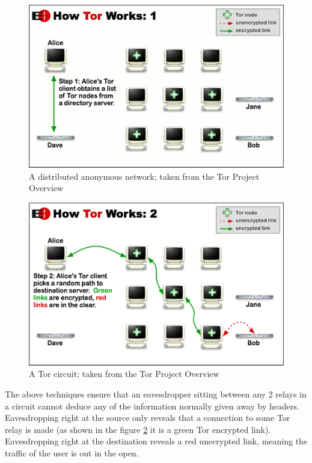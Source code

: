 \documentclass[11pt]{book} %
\begin{document}
\begin{figure}[h!]
\begin{center}
\includegraphics[scale=0.7]{htw1}
\end{center}
 \caption{A distributed anonymous network; taken from the Tor Project Overview \citep*{web:torOverview}}
 \label{fig:torNetwork}
 \end{figure}

\begin{figure}[h!]
\begin{center}
\includegraphics[scale=0.7]{htw2}
\end{center}
 \caption{A Tor circuit; taken from the Tor Project Overview \citep*{web:torOverview}}
 \label{fig:torCircuit}
 \end{figure}

The above techniques ensure that an eavesdropper sitting between any 2 relays in a circuit cannot deduce any of the information normally given away by headers. Eavesdropping right at the source  only reveals that a connection to some Tor relay is made (as shown in the figure \ref{fig:torCircuit} it is a green Tor encrypted link). Eavesdropping right at the destination reveals a red unecrypted link, meaning the traffic of the user is out in the open.
\end{document}
